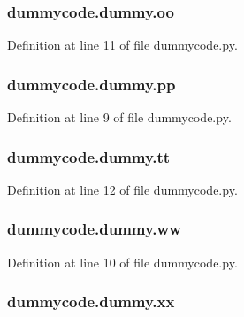 \subsubsection[{oo}]{\setlength{\rightskip}{0pt plus 5cm}dummycode.\-dummy.\-oo}\label{classdummycode_1_1dummy_a49635a45286e102fb960d0bc4f4c3621}


Definition at line 11 of file dummycode.\-py.

\subsubsection[{pp}]{\setlength{\rightskip}{0pt plus 5cm}dummycode.\-dummy.\-pp}\label{classdummycode_1_1dummy_a4ded8e4fa38d817b96c7b21a869a16ae}


Definition at line 9 of file dummycode.\-py.

\subsubsection[{tt}]{\setlength{\rightskip}{0pt plus 5cm}dummycode.\-dummy.\-tt}\label{classdummycode_1_1dummy_ac1a6206c9bd102d051018258c3b54de9}


Definition at line 12 of file dummycode.\-py.

\subsubsection[{ww}]{\setlength{\rightskip}{0pt plus 5cm}dummycode.\-dummy.\-ww}\label{classdummycode_1_1dummy_a65b1604eb43ffa41eb49a02655397fb7}


Definition at line 10 of file dummycode.\-py.

\subsubsection[{xx}]{\setlength{\rightskip}{0pt plus 5cm}dummycode.\-dummy.\-xx}\label{classdummycode_1_1dummy_af1ae41fb24a1c0a52ae60bd1f2db9f5f}


